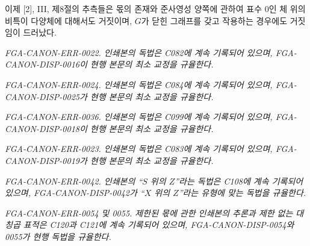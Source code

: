 이제 [2], III, 제8절의 추측들은 몫의 존재와 준사영성 양쪽에 관하여 표수
0인 체 위의 비특이 다양체에 대해서도 거짓이며, $G$가 닫힌 그래프를 갖고
작용하는 경우에도 거짓임이 드러났다.

\par\smallskip
\begingroup\footnotesize
\noindent\textit{FGA-CANON-ERR-0022. 인쇄본의 독법은 C082에 계속 기록되어 있으며, FGA-CANON-DISP-0016이 현행 본문의 최소 교정을 규율한다.}\par
\noindent\textit{FGA-CANON-ERR-0024. 인쇄본의 독법은 C084에 계속 기록되어 있으며, FGA-CANON-DISP-0025가 현행 본문의 최소 교정을 규율한다.}\par
\noindent\textit{FGA-CANON-ERR-0036. 인쇄본의 독법은 C099에 계속 기록되어 있으며, FGA-CANON-DISP-0018이 현행 본문의 최소 교정을 규율한다.}\par
\noindent\textit{FGA-CANON-ERR-0023. 인쇄본의 독법은 C083에 계속 기록되어 있으며, FGA-CANON-DISP-0019가 현행 본문의 최소 교정을 규율한다.}\par
\noindent\textit{FGA-CANON-ERR-0042. 인쇄본의 ``$S$ 위의 $Z$''라는 독법은 C108에 계속 기록되어 있으며, FGA-CANON-DISP-0042가 ``$X$ 위의 $Z$''라는 유형에 맞는 독법을 규율한다.}\par
\noindent\textit{FGA-CANON-ERR-0054 및 0055. 제한된 몫에 관한 인쇄본의 추론과 제한 없는 대칭곱 표적은 C120과 C121에 계속 기록되어 있으며, FGA-CANON-DISP-0054와 0055가 현행 독법을 규율한다.}\par
\endgroup
